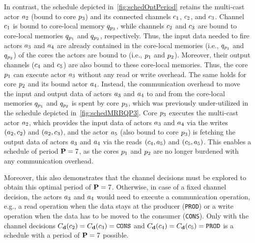 In contrast, the schedule depicted in~\cref{fig:schedOptPeriod} retains the multi-cast actor $a_2$ (bound to core $p_3$) and its connected channels $c_1$, $c_2$, and $c_3$.
Channel $c_1$ is bound to core-local memory $q_{p_3}$, while channels $c_2$ and $c_3$ are bound to core-local memories $q_{p_1}$ and $q_{p_2}$, respectively.
Thus, the input data needed to fire actors $a_3$ and $a_4$ are already contained in the core-local memories (i.e., $q_{p_1}$ and $q_{p_2}$) of the cores the actors are bound to (i.e., $p_1$ and $p_2$).
Moreover, their output channels ($c_4$ and $c_5$) are also bound to these core-local memories.
Thus, the core $p_1$ can execute actor $a_3$ without any read or write overhead.
The same holds for core $p_2$ and its bound actor $a_4$.
Instead, the communication overhead to move the input and output data of actors $a_3$ and $a_4$ to and from the core-local memories $q_{p_1}$ and $q_{p_2}$ is spent by core $p_3$, which was previously under-utilized in the schedule depicted in~\cref{fig:schedMRBQP3}.
Core $p_3$ executes the multi-cast actor $a_2$, which provides the input data of actors $a_3$ and $a_4$ via the writes $(a_2,c_2)$ and $(a_2,c_3)$, and the actor $a_5$ (also bound to core $p_3$) is fetching the output data of actors $a_3$ and $a_4$ via the reads $(c_4,a_5)$ and $(c_5,a_5)$.
This enables a schedule of period $\mathbf{P} = 7$, as the cores $p_1$ and $p_2$ are no longer burdened with any communication overhead.

Moreover, this also demonstrates that the channel decisions must be explored to obtain this optimal period of $\mathbf{P} = 7$.
Otherwise, in case of a fixed channel decision, the actors $a_3$ and $a_4$ would need to execute a communication operation, e.g., a read operation when the data stays at the producer (\texttt{PROD}) or a write operation when the data has to be moved to the consumer (\texttt{CONS}).
Only with the channel decisions $C_\mathtt{\mathbf{d}}(c_2) = C_\mathtt{\mathbf{d}}(c_3) = \texttt{CONS}$ and $C_\mathtt{\mathbf{d}}(c_4) = C_\mathtt{\mathbf{d}}(c_5) = \texttt{PROD}$ is a schedule with a period of $\mathbf{P} = 7$ possible.

